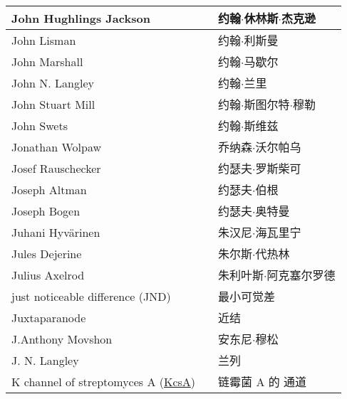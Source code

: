 \begin{longtable}{lll}
	\midrule
	John Hughlings Jackson   && 约翰$\cdot$休林斯$\cdot$杰克逊  \\
	
	\midrule
	John Lisman   && 约翰$\cdot$利斯曼  \\
	
	\midrule
	John Marshall   && 约翰$\cdot$马歇尔  \\
	
	\midrule
	John N. Langley   && 约翰$\cdot$兰里  \\
	
	\midrule
	John Stuart Mill   && 约翰$\cdot$斯图尔特$\cdot$穆勒  \\
	
	\midrule
	John Swets   && 约翰$\cdot$斯维兹  \\
	
	\midrule
	Jonathan Wolpaw   && 乔纳森$\cdot$沃尔帕乌  \\
	
	\midrule
	Josef Rauschecker   && 约瑟夫$\cdot$罗斯柴可  \\
	
	\midrule
	Joseph Altman   && 约瑟夫$\cdot$伯根  \\
	
	\midrule
	Joseph Bogen   && 约瑟夫$\cdot$奥特曼  \\
	
	\midrule
	Juhani Hyvärinen   && 朱汉尼$\cdot$海瓦里宁  \\
	
	\midrule
	Jules Dejerine   && 朱尔斯$\cdot$代热林  \\
	
	\midrule
	Julius Axelrod   && 朱利叶斯$\cdot$阿克塞尔罗德  \\
	
	\midrule
	just noticeable difference (JND)   && 最小可觉差  \\
	
	\midrule
	Juxtaparanode   && 近结  \\
	
	\midrule
	J.Anthony Movshon   && 安东尼$\cdot$穆松  \\
	
	\midrule
	J. N. Langley   && 兰列  \\
	
	\midrule
	K channel of streptomyces A (\href{https://en.wikipedia.org/wiki/KcsA_potassium_channel}{KcsA})  && 链霉菌 A 的 \ce{K+} 通道  \\
	

\end{longtable}
